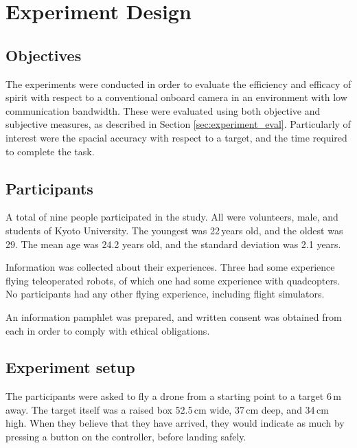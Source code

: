 \chapter{Experiment Design}

\section{Objectives}
  The experiments were conducted in order to evaluate the efficiency and efficacy of \gls{spirit} with respect to a conventional onboard camera in an environment with low communication bandwidth.
  These were evaluated using both objective and subjective measures, as described in Section \ref{sec:experiment_eval}.
  Particularly of interest were the spacial accuracy with respect to a target, and the time required to complete the task.

\section{Participants}
A total of nine people participated in the study.
All were volunteers, male, and students of Kyoto University.
The youngest was 22\,years old, and the oldest was 29.
The mean age was 24.2 years old, and the standard deviation was 2.1 years.

Information was collected about their experiences.
Three had some experience flying teleoperated robots, of which one had some experience with quadcopters.
No participants had any other flying experience, including flight simulators.

An information pamphlet was prepared, and written consent was obtained from each in order to comply with ethical obligations.

\section{Experiment setup}
The participants were asked to fly a drone from a starting point to a target 6\,m away.
The target itself was a raised box 52.5\,cm wide, 37\,cm deep, and 34\,cm high.
When they believe that they have arrived, they would indicate as much by pressing a button on the controller, before landing safely.

